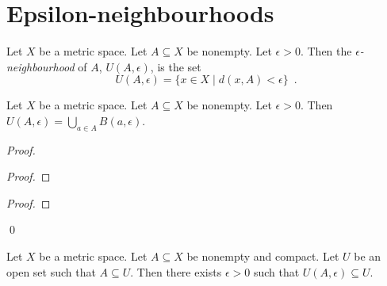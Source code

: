 \section{Epsilon-neighbourhoods}

\begin{definition}
    Let $X$ be a metric space. Let $A \subseteq X$ be nonempty. Let $\epsilon > 0$.
    Then the \emph{$\epsilon$-neighbourhood} of $A$, $U(A,\epsilon)$, is the set
    \[ U(A, \epsilon) = \{ x \in X \mid d(x,A) < \epsilon \} \enspace . \]
\end{definition}

\begin{proposition}
    \label{proposition:epsilon_neighbourhood}
    Let $X$ be a metric space. Let $A \subseteq X$ be nonempty. Let $\epsilon > 0$.
    Then $U(A, \epsilon) = \bigcup_{a \in A} B(a, \epsilon)$.    
\end{proposition}

\begin{proof}
    \pf
    \begin{proof}
    \end{proof}
    \begin{proof}
    \end{proof}
    \qed
\end{proof}

\begin{proposition}
    Let $X$ be a metric space. Let $A \subseteq X$ be nonempty and compact.
    Let $U$ be an open set such that $A \subseteq U$. Then there exists $\epsilon > 0$
    such that $U(A,\epsilon) \subseteq U$.
\end{proposition}

